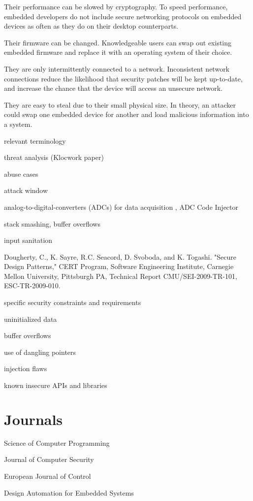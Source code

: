 \documentclass[final,conference,10pt]{IEEEtran}
\begin{document}
Their performance can be slowed by cryptography. To speed performance, embedded developers do not include secure networking protocols on embedded devices as often as they do on their desktop counterparts.

Their firmware can be changed. Knowledgeable users can swap out existing embedded firmware and replace it with an operating system of their choice.

They are only intermittently connected to a network. Inconsistent network connections reduce the likelihood that security patches will be kept up-to-date, and increase the chance that the device will access an unsecure network.

They are easy to steal due to their small physical size. In theory, an attacker could swap one embedded device for another and load malicious information into a system.


	relevant terminology 

		threat analysis (Klocwork paper)

		abuse cases

		attack window

		analog-to-digital-converters (ADCs) for data acquisition , ADC Code Injector

		stack smashing, buffer overflows

		input sanitation

		Dougherty, C., K. Sayre, R.C. Seacord, D. Svoboda, and K. Togashi. "Secure Design Patterns," CERT Program, Software Engineering Institute, Carnegie Mellon University, Pittsburgh PA, Technical Report CMU/SEI-2009-TR-101, ESC-TR-2009-010.

specific security constraints and requirements

		uninitialized data

		 buffer overflows

use of dangling pointers

injection flaws

known insecure APIs and libraries


\section{Journals}

Science of Computer Programming

Journal of Computer Security

European Journal of Control

Design Automation for Embedded Systems
\end{document}
